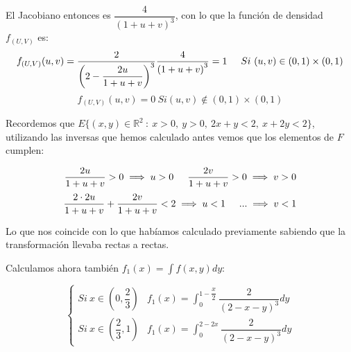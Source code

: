 \documentclass[openany]{book}
\begin{document}
\begin{exercise}
    El Jacobiano entonces es $ \dfrac{4}{(1+u+v)^3} $, con lo que la función de densidad $ f_{(U,V)} $ es:
    $$ f_{(U,V)}(u,v) = \dfrac{2}{\left(2-\dfrac{2u}{1+u+v}\right)^3} \dfrac{4}{\left( 1+u+v \right)^3} = 1 \hspace{5mm} Si\ (u,v)\in (0,1)\times(0,1) $$
    $$ f_{(U,V)}(u,v) = 0\ Si (u,v) \not \in (0,1) \times (0,1) $$

    
    Recordemos que $ E \{(x,y) \in \mathbb{R} ^2\ :\ x> 0 ,\ y>0,\ 2x+y<2,\ x+2y<2\}  $, utilizando las inversas que hemos calculado antes vemos que los elementos de $ F $ cumplen:

    $$ \dfrac{2u}{1+u+v} >0 \implies u > 0 \hspace{5mm} \dfrac{2v}{1+u+v} >0 \implies v >0 $$
    $$ \dfrac{2\cdot 2 u}{1+u+v}+\dfrac{2v}{1+u+v} < 2 \implies u < 1 \hspace{5mm } ... \implies v <1$$

    Lo que nos coincide con lo que habíamos calculado previamente sabiendo que la transformación llevaba rectas a rectas.

    Calculamos ahora también $ f_{1}(x) = \int f(x,y)dy $:
    
    $$ \left\{
    \begin{array}{ll}
        Si\ x \in (0,\dfrac{2}{3}) & f_{1}(x) = \int_{0}^{1-\dfrac{x}{2}} \dfrac{2}{(2-x-y)^3}dy\\
        Si\ x \in (\dfrac{2}{3},1) & f_{1}(x) = \int_{0}^{2-2x}\dfrac{2}{(2-x-y)^3} dy
    \end{array}
    \right. $$


\end{exercise}
\end{document}
